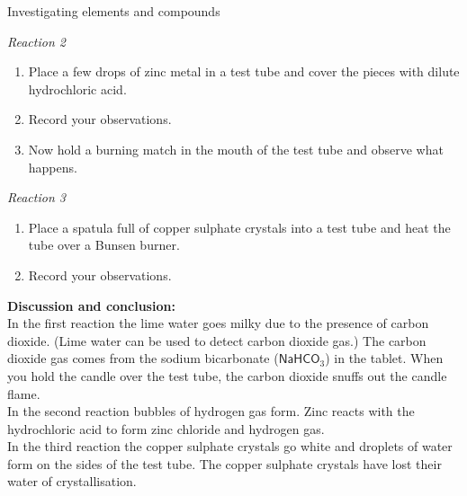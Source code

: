\begin{g_experiment}{Investigating elements and compounds}
\begin{enumerate}[label=\textbf{\arabic*}.]
\end{enumerate}
\textsl{Reaction 2}
\begin{enumerate}[label=\textbf{\arabic*}.]
\item Place a few drops of zinc metal in a test tube and cover the pieces with dilute hydrochloric acid.
\item Record your observations.
\item Now hold a burning match in the mouth of the test tube and observe what happens.
\end{enumerate}
\textsl{Reaction 3}
\begin{enumerate}[label=\textbf{\arabic*}.]
\item Place a spatula full of copper sulphate crystals into a test tube and heat the tube over a Bunsen burner.
\item Record your observations.
\end{enumerate}
\textbf{Discussion and conclusion:}\\
In the first reaction the lime water goes milky due to the presence of carbon dioxide. (Lime water can be used to detect carbon dioxide gas.) The carbon dioxide gas comes from the sodium bicarbonate ($\textsf{NaHCO}_3$) in the tablet. When you hold the candle over the test tube, the carbon dioxide snuffs out the candle flame. \\
In the second reaction bubbles of hydrogen gas form. Zinc reacts with the hydrochloric acid to form zinc chloride and hydrogen gas. \\
In the third reaction the copper sulphate crystals go white and droplets of water form on the sides of the test tube. The copper sulphate crystals have lost their water of crystallisation. 
\end{g_experiment}
{}
